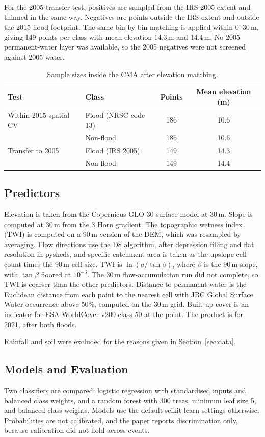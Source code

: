 \documentclass[conference]{IEEEtran}
\begin{document}
For the 2005 transfer test, positives are sampled from the IRS 2005 extent and thinned in the same way. Negatives are points outside the IRS extent and outside the 2015 flood footprint. The same bin-by-bin matching is applied within 0--30\,m, giving 149 points per class with mean elevation 14.3\,m and 14.4\,m. No 2005 permanent-water layer was available, so the 2005 negatives were not screened against 2005 water.

\begin{table}[h]
\centering
\caption{Sample sizes inside the CMA after elevation matching.}
\label{tab:samples}
\begin{tabular}{llcc}
\toprule
Test & Class & Points & Mean elevation (m) \\
\midrule
Within-2015 spatial CV & Flood (NRSC code 13) & 186 & 10.6 \\
 & Non-flood & 186 & 10.6 \\
Transfer to 2005 & Flood (IRS 2005) & 149 & 14.3 \\
 & Non-flood & 149 & 14.4 \\
\bottomrule
\end{tabular}
\end{table}

\subsection{Predictors}
Elevation is taken from the Copernicus GLO-30 surface model at 30\,m. Slope is computed at 30\,m from the 3 Horn gradient. The topographic wetness index (TWI) is computed on a 90\,m version of the DEM, which was resampled by averaging. Flow directions use the D8 algorithm, after depression filling and flat resolution in pysheds, and specific catchment area is taken as the upslope cell count times the 90\,m cell size. TWI is $\ln(a/\tan\beta)$, where $\beta$ is the 90\,m slope, with $\tan\beta$ floored at $10^{-3}$. The 30\,m flow-accumulation run did not complete, so TWI is coarser than the other predictors. Distance to permanent water is the Euclidean distance from each point to the nearest cell with JRC Global Surface Water occurrence above 50\%, computed on the 30\,m grid. Built-up cover is an indicator for ESA WorldCover v200 class 50 at the point. The product is for 2021, after both floods.

Rainfall and soil were excluded for the reasons given in Section~\ref{sec:data}.

\subsection{Models and Evaluation}
Two classifiers are compared: logistic regression with standardised inputs and balanced class weights, and a random forest with 300 trees, minimum leaf size 5, and balanced class weights. Models use the default scikit-learn settings otherwise. Probabilities are not calibrated, and the paper reports discrimination only, because calibration did not hold across events.
\end{document}
